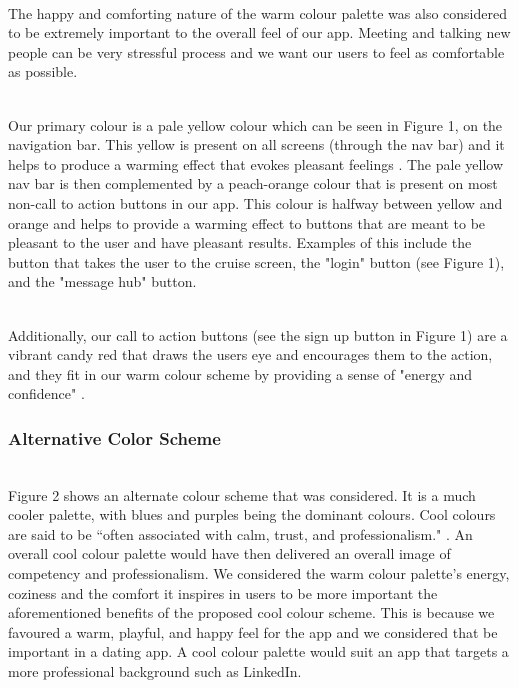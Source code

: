 \documentclass[a4paper, 11pt]{article}
\begin{document}
~\\
The happy and comforting nature of the warm colour palette was also considered to be extremely important to the overall feel of our app. Meeting and talking new people can be very stressful process and we want our users to feel as comfortable as possible. 

~\\
Our primary colour is a pale yellow colour which can be seen in Figure 1, on the navigation bar. This yellow is present on all screens (through the nav bar) and it helps to produce a warming effect that evokes pleasant feelings \cite{color}. The pale yellow nav bar is then complemented by a peach-orange colour that is present on most non-call to action buttons in our app. This colour is halfway between yellow and orange and helps to provide a warming effect to buttons that are meant to be pleasant to the user and have pleasant results. Examples of this include the button that takes the user to the cruise screen, the "login" button (see Figure 1), and the "message hub" button. 

~\\
Additionally, our call to action buttons (see the sign up button in Figure 1) are a vibrant candy red that draws the users eye and encourages them to the action, and they fit in our warm colour scheme by providing a sense of "energy and confidence" \cite{color}.

\subsubsection{Alternative Color Scheme}

~\\
Figure 2 shows an alternate colour scheme that was considered. It is a much cooler palette, with blues and purples being the dominant colours. Cool colours are said to be ``often associated with calm, trust, and professionalism." \cite{color}. An overall cool colour palette would have then delivered an overall image of competency and professionalism. We considered the warm colour palette's energy, coziness and the comfort it inspires in users to be more important the aforementioned benefits of the proposed cool colour scheme. This is because we favoured a warm, playful, and happy feel for the app and we considered that be important in a dating app. A cool colour palette would suit an app that targets a more professional background such as LinkedIn.
\end{document}
